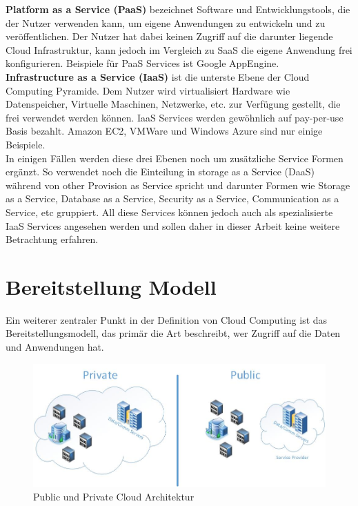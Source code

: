 \textbf{Platform as a Service (PaaS)} bezeichnet Software und Entwicklungstools, die der Nutzer verwenden kann, um eigene Anwendungen zu entwickeln und zu veröffentlichen. Der Nutzer hat dabei keinen Zugriff auf die darunter liegende Cloud Infrastruktur, kann jedoch im Vergleich zu SaaS die eigene Anwendung frei konfigurieren. Beispiele für PaaS Services ist Google AppEngine.
\\

\textbf{Infrastructure as a Service (IaaS)} ist die unterste Ebene der Cloud Computing Pyramide. Dem Nutzer wird virtualisiert Hardware wie Datenspeicher, Virtuelle Maschinen, Netzwerke, etc. zur Verfügung gestellt, die frei verwendet werden können. IaaS Services werden gewöhnlich auf pay-per-use Basis bezahlt. Amazon EC2, VMWare und Windows Azure sind nur einige Beispiele.
\\

In einigen Fällen werden diese drei Ebenen noch um zusätzliche Service Formen ergänzt. So verwendet \cite[S. 28]{Tharam.2010} noch die Einteilung in storage as a Service (DaaS) während \cite[S. 123]{Mahmood.2011} von other Provision as Service spricht und darunter Formen wie Storage as a Service, Database as a Service, Security as a Service, Communication as a Service, etc gruppiert. All diese Services können jedoch auch als spezialisierte IaaS Services angesehen werden und sollen daher in dieser Arbeit keine weitere Betrachtung erfahren.


\section{Bereitstellung Modell}\label{bereitstellung}
Ein weiterer zentraler Punkt in der Definition von Cloud Computing ist das Bereitstellungsmodell, das primär die Art beschreibt, wer Zugriff auf die Daten und Anwendungen hat.

	\begin{figure}[h]
		\centering
		\includegraphics[width=0.9\linewidth]{images/private_public_cloud}
		\caption{Public und Private Cloud Architektur}
		\label{fig:PublicPrivateCloud}
	\end{figure}

